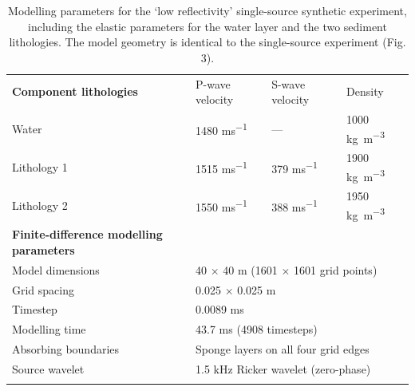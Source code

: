 \documentclass[se,manuscript]{copernicus}
\begin{document}
\begin{table}
    \caption{Modelling parameters for the `low reflectivity' single-source synthetic experiment, including the elastic parameters for the water layer and the two sediment lithologies. The model geometry is identical to the single-source experiment (Fig. 3).}
    \label{table:single-source-low-reflectivity-parameters}
    \begin{tabular}{llll}
        \tophline
        \textbf{Component lithologies} & P-wave velocity & S-wave velocity & Density \\
        \middlehline
        Water & 1480 \unit{ms^{-1}} & --- & 1000 \unit{kg m^{-3}} \\
        Lithology 1 & 1515 \unit{ms^{-1}} & 379 \unit{ms^{-1}} & 1900 \unit{kg m^{-3}} \\
        Lithology 2 & 1550 \unit{ms^{-1}} & 388 \unit{ms^{-1}} & 1950 \unit{kg m^{-3}} \\
        \middlehline
        \textbf{Finite-difference modelling parameters} \\
        \middlehline
        Model dimensions & \multicolumn{3}{l}{40 $\times$ 40 \unit{m} (1601 $\times$ 1601 grid points)} \\
        Grid spacing & \multicolumn{3}{l}{0.025 $\times$ 0.025 \unit{m}} \\
        Timestep & \multicolumn{3}{l}{0.0089 \unit{ms}}\\
        Modelling time & \multicolumn{3}{l}{43.7 \unit{ms} (4908 timesteps)} \\
        Absorbing boundaries & \multicolumn{3}{l}{Sponge layers on all four grid edges} \\
        Source wavelet & \multicolumn{3}{l}{1.5 \unit{kHz} Ricker wavelet (zero-phase)} \\
        \bottomhline
    \end{tabular}
\end{table}
\end{document}
